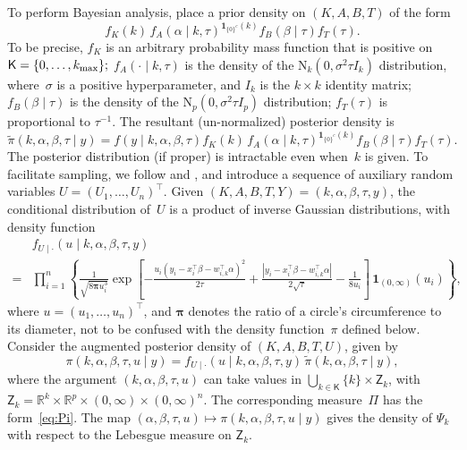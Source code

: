 \documentclass[12pt]{article}
\newcommand{\Z}{\mathsf{Z}}
\newcommand{\ind}{\mathbf{1}}
\begin{document}
	To perform Bayesian analysis, place a prior density on $(K,A,B,T)$ of the form
	\[
	f_K(k) \, f_A(\alpha \mid k, \tau)^{\ind_{\{0\}^c}(k)} f_B(\beta \mid \tau) f_T(\tau).
	\]
	To be precise, $f_K$ is an arbitrary probability mass function that is positive on $\mathsf{K}= \{0, \dots, k_{\scriptsize \mbox{max}}\};$ 
	$f_A(\cdot \mid k, \tau)$ is the density of the $\mbox{N}_k(0, \sigma^2 \tau I_k)$ distribution, where~$\sigma$ is a positive hyperparameter, and $I_k$ is the $k \times k$ identity matrix;
	$f_B(\beta \mid \tau)$ is the density of the $\mbox{N}_p(0, \sigma^2 \tau I_p)$ distribution;
	$f_T(\tau)$ is proportional to $\tau^{-1}$.
	The resultant (un-normalized) posterior density is
	\[
	\tilde{\pi}(k, \alpha, \beta, \tau \mid y) = f(y \mid k, \alpha,\beta,\tau) f_K(k) \, f_A(\alpha \mid k, \tau)^{\ind_{\{0\}^c}(k)} f_B(\beta \mid \tau) f_T(\tau).
	\]
	The posterior distribution (if proper) is intractable even when~$k$ is given.
	To facilitate sampling, we follow \cite{liu1996bayesian} and \cite{choi2013analysis}, and introduce a sequence of auxiliary random variables $U = (U_1, \dots, U_n)^{\top}$.
	Given $(K,A,B,T,Y) = (k, \alpha, \beta, \tau,y)$, the conditional distribution of~$U$ is a product of inverse Gaussian distributions, with density function
	\[
	\begin{aligned}
		&f_{U \mid \cdot}(u \mid k, \alpha, \beta, \tau, y) \\
		=& \prod_{i=1}^n \left\{ \frac{1}{\sqrt{8\bm{\pi} u_i^3}} \exp \left[ -  \frac{u_i (y_i - x_i^{\top} \beta - w_{i,k}^{\top} \alpha )^2}{2\tau} + \frac{|y_i - x_i^{\top} \beta - w_{i,k}^{\top} \alpha|}{2\sqrt{\tau}}  - \frac{1}{8u_i} \right]  \, \ind_{(0,\infty)}(u_i) \right\},
	\end{aligned}
	\]
	where $u = (u_1, \dots, u_n)^{\top}$, and $\bm{\pi}$ denotes the ratio of a circle's circumference to its diameter, not to be confused with the density function~$\pi$ defined below.
	Consider the augmented posterior density of $(K, A, B, T, U)$, given by
	\[
	\pi(k,\alpha,\beta,\tau,u \mid y) = f_{U \mid \cdot}(u \mid k, \alpha, \beta, \tau, y) \, \tilde{\pi}(k, \alpha, \beta, \tau \mid y),
	\]
	where the argument $(k, \alpha, \beta, \tau, u)$ can take values in $\bigcup_{k \in \mathsf{K}} \{k\} \times \Z_k$, with $\Z_k = \mathbb{R}^k \times \mathbb{R}^p \times (0,\infty) \times (0,\infty)^n$.
	The corresponding measure~$\Pi$ has the form~\eqref{eq:Pi}.
	The map $(\alpha, \beta, \tau, u) \mapsto \pi(k, \alpha, \beta, \tau, u \mid y)$ gives the density of $\Psi_k$ with respect to the Lebesgue measure on $\Z_k$.
	
\end{document}
